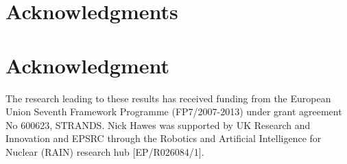 \ifCLASSOPTIONcompsoc
  \section*{Acknowledgments}

\else
  \section*{Acknowledgment}
\fi

The research leading to these results has received funding from the European Union Seventh Framework Programme (FP7/2007-2013) under grant agreement No 600623, STRANDS. Nick Hawes was supported by UK Research and Innovation and EPSRC through the Robotics and Artificial Intelligence for Nuclear (RAIN) research hub [EP/R026084/1].
